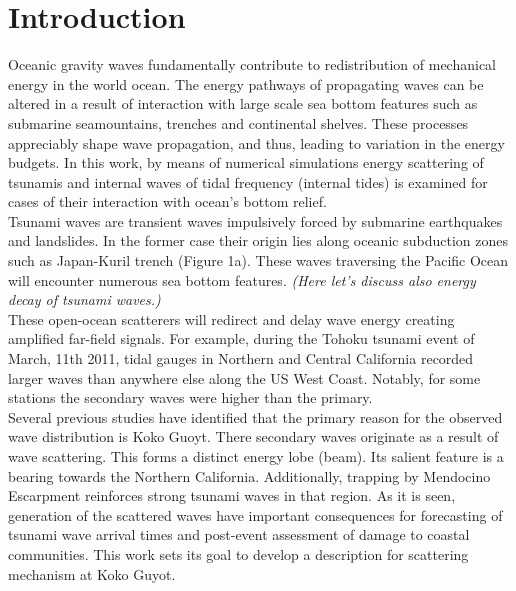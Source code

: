 \section{Introduction}
Oceanic gravity waves fundamentally contribute to redistribution of mechanical energy in the world ocean. The energy pathways of propagating waves can be altered in a result of interaction with large scale sea bottom features such as submarine seamountains, trenches and continental shelves. These processes appreciably shape wave propagation, and thus, leading to variation in the energy budgets. In this work, by means of numerical simulations  energy scattering of tsunamis and internal waves of tidal frequency (internal tides) is examined for cases of their interaction with ocean's bottom relief.\\
Tsunami waves are transient waves impulsively forced by submarine earthquakes and landslides. In the former case their origin lies along oceanic subduction zones such as Japan-Kuril trench (Figure 1a). These waves traversing the Pacific Ocean will encounter numerous sea bottom features. \textit{(Here let's discuss also energy decay of tsunami waves.)}\\
These open-ocean scatterers will redirect and delay wave energy creating amplified far-field signals. For example, during the Tohoku tsunami event of March, 11th 2011, tidal gauges in Northern and Central California recorded larger waves than anywhere else along the US West Coast. Notably, for some stations the secondary waves were higher than the primary.\\
Several previous studies have identified that the primary reason for the observed wave distribution is Koko Guoyt. There secondary waves originate as a result of wave scattering. This forms a distinct energy lobe (beam). Its salient feature is a bearing towards the Northern California. Additionally, trapping by Mendocino Escarpment reinforces strong tsunami waves in that region.  As it is seen, generation of the scattered waves have important consequences for forecasting of tsunami wave arrival times and post-event assessment of damage to coastal communities. This work sets its goal to develop a description for scattering mechanism at Koko Guyot.\\
